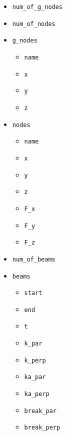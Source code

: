 \documentclass{article}
\begin{document}
\begin{itemize}
\item \texttt{num\_of\_g\_nodes}
\item \texttt{num\_of\_nodes}
\item \texttt{g\_nodes}
	\begin{itemize}
	\item \texttt{name}
	\item \texttt{x}
	\item \texttt{y}
	\item \texttt{z}
	\end{itemize}
\item \texttt{nodes}
	\begin{itemize}
	\item \texttt{name}
	\item \texttt{x}
	\item \texttt{y}
	\item \texttt{z}
	\item \texttt{F\_x} 
	\item \texttt{F\_y} 
	\item \texttt{F\_z} 
	\end{itemize}
\item \texttt{num\_of\_beams}
\item \texttt{beams}
	\begin{itemize}
	\item \texttt{start}
	\item \texttt{end}
	\item \texttt{t} 
	\item \texttt{k\_par} 
	\item \texttt{k\_perp}
	\item \texttt{ka\_par} 
	\item \texttt{ka\_perp}
	\item \texttt{break\_par}
	\item \texttt{break\_perp}
	\end{itemize}
\end{itemize}
\end{document}
